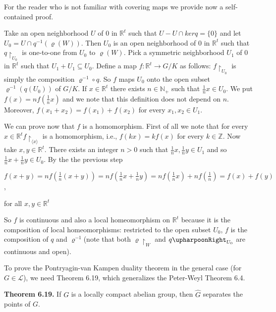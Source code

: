 \documentclass[12pt]{article}
\begin{document}
\begin{itemize}
\begin{itemize}
    For the reader who is not familiar with covering maps we provide now a self-contained proof.


    Take an open neighborhood $U$ of 0 in $\mathbb{R}^t$ such that $U - U \cap ker q = \{0\}$ and let $U_0 = U \cap q^{-1}(\varrho(W))$.
Then $U_0$ is an open neighborhood of 0 in $\mathbb{R}^t$ such that $q \upharpoonright_{U_0}$ is one-to-one from $U_0$ to $\varrho(W)$. Pick a symmetric
neighborhood $U_1$ of 0 in $\mathbb{R}^t$ such that $U_1 + U_1 \subseteq U_0$. Define a map $f : \mathbb{R}^t \to G/K$ as follows: $f \upharpoonright_{U_0}$ is simply
the composition $\varrho^{-1} \circ q$. So $f$ maps $U_0$ onto the open subset $\varrho^{-1}(q(U_0))$ of $G/K$. If $x \in \mathbb{R}^t$ there exists $n \in \mathbb{N}_+$
such that $\frac{1}{n} x \in U_0$. We put $f(x) = nf(\frac{1}{n} x)$ and we note that this definition does not depend on $n$. Moreover,
$f(x_1 + x_2) = f(x_1) + f(x_2)$ for every $x_1, x_2 \in U_1$.


    We can prove now that $f$ is a homomorphism. First of all we note that for every $x \in \mathbb{R}^t f \upharpoonright_{\langle x \rangle}$ is a
homomorphism, i.e., $f(kx) = kf(x)$ for every $k \in \mathbb{Z}$. Now take $x, y \in \mathbb{R}^t$. There exists an integer $n > 0$ such
that $\frac{1}{n}x, \frac{1}{n}y \in U_1$ and so $\frac{1}{n}x + \frac{1}{n}y \in U_0$. By the the previous step


    $f(x + y) = nf (\frac{1}{n}(x + y))= nf (\frac{1}{n}x + \frac{1}{n}y)= nf (\frac{1}{n}x)+ nf (\frac{1}{n})= f(x) + f(y)$,


for all $x,y \in \mathbb{R}^t$


    So $f$ is continuous and also a local homeomorphism on $\mathbb{R}^t$ because it is the composition of local homeomorphisms:
restricted to the open subset $U_0$, $f$ is the composition of $q$ and $\varrho^{-1}$(note that both $\varrho \upharpoonright_W$ and $q \upharpoonRight_{U_0}$ are
continuous and open).


    To prove the Pontryagin-van Kampen duality theorem in the general case (for $G \in \mathcal{L}$), we need Theorem
6.19, which generalizes the Peter-Weyl Theorem 6.4.


\textbf{Theorem 6.19.} If $G$ is a locally compact abelian group, then $\hat{G}$ separates the points of $G$.



\end{itemize}
\end{itemize}
\end{document}

